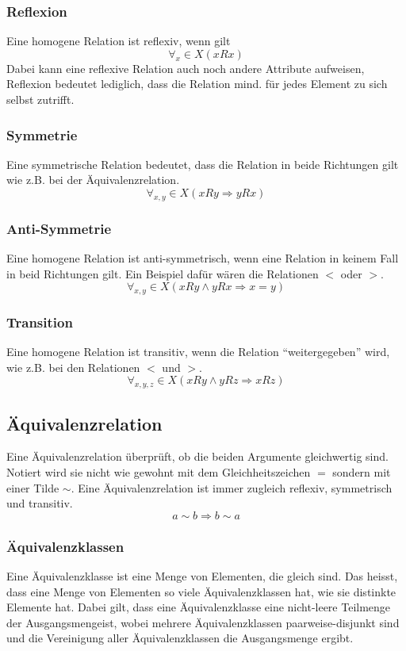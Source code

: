\documentclass{article}
\begin{document}
\subsubsection{Reflexion}
Eine homogene Relation ist reflexiv, wenn gilt $$\forall_x \in X (xRx)$$
Dabei kann eine reflexive Relation auch noch andere Attribute aufweisen, Reflexion bedeutet lediglich, dass die Relation mind. für jedes Element zu sich selbst zutrifft.
\subsubsection{Symmetrie}
Eine symmetrische Relation bedeutet, dass die Relation in beide Richtungen gilt wie z.B. bei der Äquivalenzrelation. $$\forall_{x,y}\in X (xRy \Rightarrow yRx)$$
\subsubsection{Anti-Symmetrie}
Eine homogene Relation ist anti-symmetrisch, wenn eine Relation in keinem Fall in beid Richtungen gilt. Ein Beispiel dafür wären die Relationen $<$ oder $>$. $$\forall_{x,y} \in X (xRy \land yRx \Rightarrow x=y)$$
\subsubsection{Transition}
Eine homogene Relation ist transitiv, wenn die Relation ``weitergegeben'' wird, wie z.B. bei den Relationen $<$ und $>$. 
$$\forall_{x,y,z} \in X (xRy \land yRz \Rightarrow xRz)$$
\subsection{Äquivalenzrelation}
Eine Äquivalenzrelation überprüft, ob die beiden Argumente gleichwertig sind. Notiert wird sie nicht wie gewohnt mit dem Gleichheitszeichen $=$ sondern mit einer Tilde $\sim$. Eine Äquivalenzrelation ist immer zugleich reflexiv, symmetrisch und transitiv.
$$a\sim b \Rightarrow b \sim a$$
\subsubsection{Äquivalenzklassen}
Eine Äquivalenzklasse ist eine Menge von Elementen, die gleich sind. Das heisst, dass eine Menge von Elementen so viele Äquivalenzklassen hat, wie sie distinkte Elemente hat. Dabei gilt, dass eine Äquivalenzklasse eine nicht-leere Teilmenge der Ausgangsmengeist, wobei mehrere Äquivalenzklassen paarweise-disjunkt sind und die Vereinigung aller Äquivalenzklassen die Ausgangsmenge ergibt.
\end{document}
